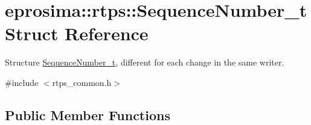\hypertarget{structeprosima_1_1rtps_1_1_sequence_number__t}{\section{eprosima\-:\-:rtps\-:\-:\-Sequence\-Number\-\_\-t \-Struct \-Reference}
\label{structeprosima_1_1rtps_1_1_sequence_number__t}
}


\-Structure \hyperlink{structeprosima_1_1rtps_1_1_sequence_number__t}{\-Sequence\-Number\-\_\-t}, different for each change in the same writer.  




{\ttfamily \#include $<$rtps\-\_\-common.\-h$>$}

\subsection*{\-Public \-Member \-Functions}

